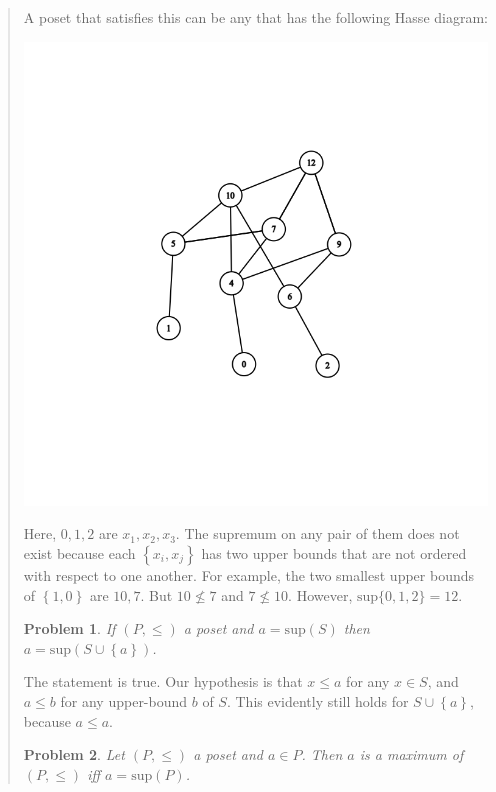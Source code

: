 \documentclass[a4paper, 12pt]{article}
\newtheorem{problem}{Problem}
\newtheorem{problem}{Problem}
\begin{document}
\begin{quote}
A poset that satisfies this can be any that has the following Hasse diagram:

\begin{center}
\includegraphics[scale=0.4]{graph}
\end{center}

Here, $0, 1, 2$ are $x_1, x_2, x_3$. The supremum on any pair of them does not
exist because each $\left\{ x_i, x_j \right\} $ has two upper bounds that are
not ordered with respect to one another. For example, the two smallest upper
bounds of $\left\{ 1, 0 \right\} $ are $10, 7$. But $10 \not\leq 7$ and $7
\not\leq 10$. However, $\text{sup}\{0, 1, 2\} = 12 $.

\begin{problem}
    If $(P, \leq) $ a poset and $a = \text{sup}(S)$ then $a = \text{sup}(S \cup
    \left\{ a \right\} )$.
\end{problem}

The statement is true. Our hypothesis is that $x \leq a$ for any $x \in S$, and $a
\leq b$ for any upper-bound $b$ of $S$. This evidently still holds for $S \cup
\left\{ a \right\} $, because $a \leq a$.

\begin{problem}
    Let $(P, \leq) $ a poset and $a \in P$. Then $a$ is a maximum of $(P, \leq)
    $ iff $a = \text{sup}(P) $.
\end{problem}


\end{quote}
\end{document}
